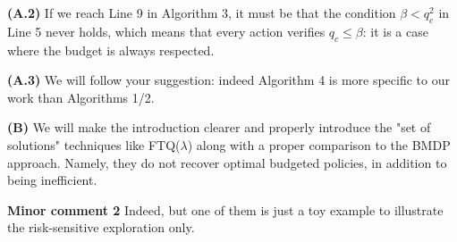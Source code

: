 \documentclass{article}
\begin{document}

\textbf{(A.2)} If we reach Line 9 in Algorithm 3, it must be that the condition $\beta < q_c^2$ in Line 5 never holds, which means that every action verifies $q_c \leq \beta$: it is a case where the budget is always respected.


\textbf{(A.3)} We will follow your suggestion: indeed Algorithm 4 is more specific to our work than Algorithms 1/2.

\textbf{(B)} We will make the introduction clearer and properly introduce the "set of solutions" techniques like FTQ($\lambda$) along with a proper comparison to the BMDP approach. Namely, they do not recover optimal budgeted policies, in addition to being inefficient.   


\textbf{Minor comment 2} Indeed, but one of them is just a toy example to illustrate the risk-sensitive exploration only.
\end{document}
